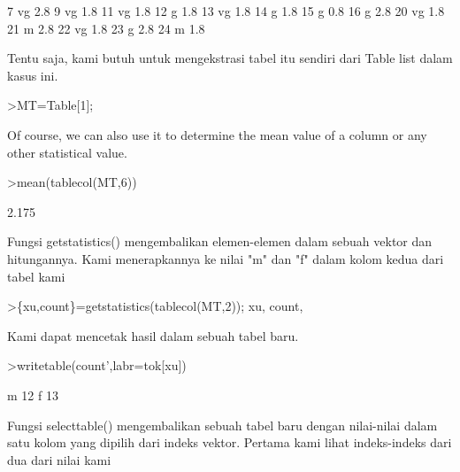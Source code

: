 \documentclass[a4paper,10pt]{article}
\begin{document}
\begin{eulernotebook}
\begin{euleroutput}
           7         vg       2.8
           9         vg       1.8
          11         vg       1.8
          12          g       1.8
          13         vg       1.8
          14          g       1.8
          15          g       0.8
          16          g       2.8
          20         vg       1.8
          21          m       2.8
          22         vg       1.8
          23          g       2.8
          24          m       1.8
\end{euleroutput}
\begin{eulercomment}
Tentu saja, kami butuh untuk mengekstrasi tabel itu sendiri dari Table list dalam kasus
ini.
\end{eulercomment}
\begin{eulerprompt}
>MT=Table[1];
\end{eulerprompt}
\begin{eulercomment}
Of course, we can also use it to determine the mean value of a column or any other statistical
value.
\end{eulercomment}
\begin{eulerprompt}
>mean(tablecol(MT,6))
\end{eulerprompt}
\begin{euleroutput}
  2.175
\end{euleroutput}
\begin{eulercomment}
Fungsi getstatistics() mengembalikan elemen-elemen dalam sebuah vektor dan hitungannya.
Kami menerapkannya ke nilai "m" dan "f" dalam kolom kedua dari tabel kami
\end{eulercomment}
\begin{eulerprompt}
>\{xu,count\}=getstatistics(tablecol(MT,2)); xu, count,
\end{eulerprompt}
\begin{euleroutput}
  [1,  3]
  [12,  13]
\end{euleroutput}
\begin{eulercomment}
Kami dapat mencetak hasil dalam sebuah tabel baru.
\end{eulercomment}
\begin{eulerprompt}
>writetable(count',labr=tok[xu])
\end{eulerprompt}
\begin{euleroutput}
           m        12
           f        13
\end{euleroutput}
\begin{eulercomment}
Fungsi selecttable() mengembalikan sebuah tabel baru dengan nilai-nilai dalam satu kolom
yang dipilih dari indeks vektor. Pertama kami lihat indeks-indeks dari dua dari nilai kami

\end{eulercomment}
\end{eulernotebook}
\end{document}
